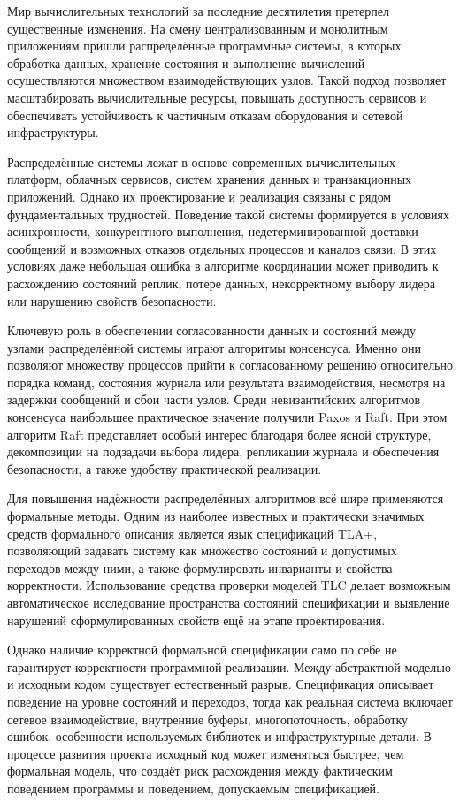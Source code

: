 \introduction %

Мир вычислительных технологий за последние десятилетия претерпел
существенные изменения. На смену централизованным и монолитным
приложениям пришли распределённые программные системы, в которых
обработка данных, хранение состояния и выполнение вычислений
осуществляются множеством взаимодействующих узлов. Такой подход
позволяет масштабировать вычислительные ресурсы, повышать доступность
сервисов и обеспечивать устойчивость к частичным отказам оборудования и
сетевой инфраструктуры.

Распределённые системы лежат в основе современных вычислительных
платформ, облачных сервисов, систем хранения данных и транзакционных
приложений. Однако их проектирование и реализация связаны с рядом
фундаментальных трудностей. Поведение такой системы формируется в
условиях асинхронности, конкурентного выполнения, недетерминированной
доставки сообщений и возможных отказов отдельных процессов и каналов
связи. В этих условиях даже небольшая ошибка в алгоритме координации
может приводить к расхождению состояний реплик, потере данных,
некорректному выбору лидера или нарушению свойств безопасности.

Ключевую роль в обеспечении согласованности данных и состояний между
узлами распределённой системы играют алгоритмы консенсуса. Именно они
позволяют множеству процессов прийти к согласованному решению
относительно порядка команд, состояния журнала или результата
взаимодействия, несмотря на задержки сообщений и сбои части узлов.
Среди невизантийских алгоритмов консенсуса наибольшее практическое
значение получили Paxos и Raft. При этом алгоритм Raft представляет
особый интерес благодаря более ясной структуре, декомпозиции на
подзадачи выбора лидера, репликации журнала и обеспечения безопасности,
а также удобству практической реализации.

Для повышения надёжности распределённых алгоритмов всё шире
применяются формальные методы. Одним из наиболее известных и
практически значимых средств формального описания является язык
спецификаций TLA+, позволяющий задавать систему как множество
состояний и допустимых переходов между ними, а также формулировать
инварианты и свойства корректности. Использование средства проверки
моделей TLC делает возможным автоматическое исследование пространства
состояний спецификации и выявление нарушений сформулированных
свойств ещё на этапе проектирования.

Однако наличие корректной формальной спецификации само по себе не
гарантирует корректности программной реализации. Между абстрактной
моделью и исходным кодом существует естественный разрыв. Спецификация
описывает поведение на уровне состояний и переходов, тогда как реальная
система включает сетевое взаимодействие, внутренние буферы,
многопоточность, обработку ошибок, особенности используемых библиотек
и инфраструктурные детали. В процессе развития проекта исходный код
может изменяться быстрее, чем формальная модель, что создаёт риск
расхождения между фактическим поведением программы и поведением,
допускаемым спецификацией.

